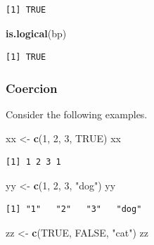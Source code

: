 \documentclass[
]{krantz}
\makeatletter
\newenvironment{Shaded}{\begin{snugshade}}{\end{snugshade}}
\newcommand{\DecValTok}[1]{\textcolor[rgb]{0.06,0.06,0.06}{#1}}
\newcommand{\KeywordTok}[1]{\textcolor[rgb]{0.27,0.27,0.27}{\textbf{#1}}}
\newcommand{\NormalTok}[1]{#1}
\newcommand{\OtherTok}[1]{\textcolor[rgb]{0.37,0.37,0.37}{#1}}
\newcommand{\StringTok}[1]{\textcolor[rgb]{0.5,0.5,0.5}{#1}}
\newenvironment{kframe}{%
\medskip{}
\setlength{\fboxsep}{.8em}
 \def\at@end@of@kframe{}%
 \ifinner\ifhmode%
  \def\at@end@of@kframe{\end{minipage}}%
  \begin{minipage}{\columnwidth}%
 \fi\fi%
 \def\FrameCommand##1{\hskip\@totalleftmargin \hskip-\fboxsep
 \colorbox{shadecolor}{##1}\hskip-\fboxsep
     \hskip-\linewidth \hskip-\@totalleftmargin \hskip\columnwidth}%
 \MakeFramed {\advance\hsize-\width
   \@totalleftmargin\z@ \linewidth\hsize
   \@setminipage}}%
 {\par\unskip\endMakeFramed%
 \at@end@of@kframe}
\renewenvironment{Shaded}{\begin{kframe}}{\end{kframe}}
\makeatother
\begin{document}
\begin{verbatim}
[1] TRUE
\end{verbatim}

\begin{Shaded}
\begin{Highlighting}[]
\KeywordTok{is.logical}\NormalTok{(bp)}
\end{Highlighting}
\end{Shaded}

\begin{verbatim}
[1] TRUE
\end{verbatim}

\hypertarget{coercion}{%
\subsubsection{Coercion}\label{coercion}}

Consider the following examples.

\begin{Shaded}
\begin{Highlighting}[]
\NormalTok{xx \textless{}{-}}\StringTok{ }\KeywordTok{c}\NormalTok{(}\DecValTok{1}\NormalTok{, }\DecValTok{2}\NormalTok{, }\DecValTok{3}\NormalTok{, }\OtherTok{TRUE}\NormalTok{)}
\NormalTok{xx}
\end{Highlighting}
\end{Shaded}

\begin{verbatim}
[1] 1 2 3 1
\end{verbatim}

\begin{Shaded}
\begin{Highlighting}[]
\NormalTok{yy \textless{}{-}}\StringTok{ }\KeywordTok{c}\NormalTok{(}\DecValTok{1}\NormalTok{, }\DecValTok{2}\NormalTok{, }\DecValTok{3}\NormalTok{, }\StringTok{"dog"}\NormalTok{)}
\NormalTok{yy}
\end{Highlighting}
\end{Shaded}

\begin{verbatim}
[1] "1"   "2"   "3"   "dog"
\end{verbatim}

\begin{Shaded}
\begin{Highlighting}[]
\NormalTok{zz \textless{}{-}}\StringTok{ }\KeywordTok{c}\NormalTok{(}\OtherTok{TRUE}\NormalTok{, }\OtherTok{FALSE}\NormalTok{, }\StringTok{"cat"}\NormalTok{)}
\NormalTok{zz}
\end{Highlighting}
\end{Shaded}
\end{document}
